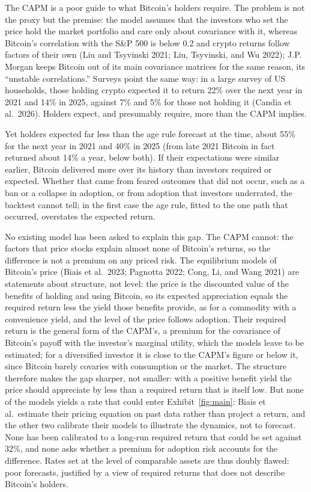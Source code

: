 \documentclass[12pt]{article}
\theoremstyle{plain}
\theoremstyle{remark}
\begin{document}
The CAPM is a poor guide to what Bitcoin's holders require. The problem is not the proxy but the premise: the model assumes that the investors who set the price hold the market portfolio and care only about covariance with it, whereas Bitcoin's correlation with the S\&P 500 is below 0.2 and crypto returns follow factors of their own (Liu and Tsyvinski 2021; Liu, Tsyvinski, and Wu 2022); J.P. Morgan keeps Bitcoin out of its main covariance matrices for the same reason, its ``unstable correlations.'' Surveys point the same way: in a large survey of US households, those holding crypto expected it to return 22\% over the next year in 2021 and 14\% in 2025, against 7\% and 5\% for those not holding it (Candia et al.\ 2026). Holders expect, and presumably require, more than the CAPM implies.

Yet holders expected far less than the age rule forecast at the time, about 55\% for the next year in 2021 and 40\% in 2025 (from late 2021 Bitcoin in fact returned about 14\% a year, below both). If their expectations were similar earlier, Bitcoin delivered more over its history than investors required or expected. Whether that came from feared outcomes that did not occur, such as a ban or a collapse in adoption, or from adoption that investors underrated, the backtest cannot tell; in the first case the age rule, fitted to the one path that occurred, overstates the expected return.

No existing model has been asked to explain this gap. The CAPM cannot: the factors that price stocks explain almost none of Bitcoin's returns, so the difference is not a premium on any priced risk. The equilibrium models of Bitcoin's price (Biais et al.\ 2023; Pagnotta 2022; Cong, Li, and Wang 2021) are statements about structure, not level: the price is the discounted value of the benefits of holding and using Bitcoin, so its expected appreciation equals the required return less the yield those benefits provide, as for a commodity with a convenience yield, and the level of the price follows adoption. Their required return is the general form of the CAPM's, a premium for the covariance of Bitcoin's payoff with the investor's marginal utility, which the models leave to be estimated; for a diversified investor it is close to the CAPM's figure or below it, since Bitcoin barely covaries with consumption or the market. The structure therefore makes the gap sharper, not smaller: with a positive benefit yield the price should appreciate by less than a required return that is itself low. But none of the models yields a rate that could enter Exhibit~\ref{fig:main}: Biais et al.\ estimate their pricing equation on past data rather than project a return, and the other two calibrate their models to illustrate the dynamics, not to forecast. None has been calibrated to a long-run required return that could be set against 32\%, and none asks whether a premium for adoption risk accounts for the difference. Rates set at the level of comparable assets are thus doubly flawed: poor forecasts, justified by a view of required returns that does not describe Bitcoin's holders.
\end{document}

